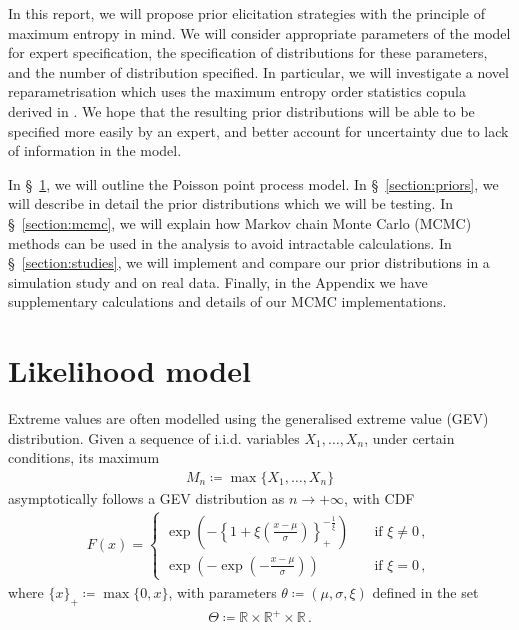 \documentclass{article}
\newcommand{\R}{\mathbb{R}}
\begin{document}
%
In this report, we will propose prior elicitation strategies
with the principle of maximum entropy in mind.
We will consider appropriate parameters of the model for expert specification,
the specification of distributions for these parameters,
and the number of distribution specified.
In particular, we will investigate a novel reparametrisation which
uses the maximum entropy order statistics copula derived in
\cite{butucea2018}. We hope that the resulting prior
distributions will be able to be specified more easily by an expert, and
better account for uncertainty due to lack of information in the model.
%

%
In \S~\ref{section:model}, we will outline the Poisson point process model.
In \S~\ref{section:priors}, we will describe in detail
the prior distributions which we will be testing.
In \S~\ref{section:mcmc}, we will explain how Markov chain Monte Carlo (MCMC)
methods can be used in the analysis to avoid intractable calculations.
In \S~\ref{section:studies}, we will implement and compare our prior
distributions in a simulation study and on real data.
Finally, in the Appendix we have supplementary calculations
and details of our MCMC implementations.
%
\section{Likelihood model}
\label{section:model}
%

%
Extreme values are often modelled using the generalised extreme value
(GEV) distribution.
Given a sequence of i.i.d. variables $X_1, \dots, X_n$,
under certain conditions,
its maximum
%
\begin{align*}
	M_n \coloneqq \max\{X_1, \dots, X_{n}\}
\end{align*}
%
asymptotically follows a GEV distribution as $n \to +\infty$,
with CDF
%
\begin{align}
	F(x) =
		\begin{cases}
			\exp\left(-\left\{1 + \xi
			\left(\frac{x - \mu}{\sigma}\right)\right\}_+
			^ {-\frac{1}{\xi}}\right)
			&\quad \text{if $\xi \neq 0$} \,,\\
			\exp(-\exp(-\frac{x - \mu}{\sigma}))
			&\quad \text{if $\xi = 0$} \,,
		\end{cases}
	\label{eq:GEV-CDF}
\end{align}
%
where $\{x\}_+ \coloneqq \max\{0, x\}$, with parameters
$\theta \coloneqq (\mu, \sigma, \xi)$ defined in the set
%
\begin{align}
	\Theta \coloneqq \R \times \R^+ \times \R \,.
	\label{eq:Theta}
\end{align}
%
\end{document}
